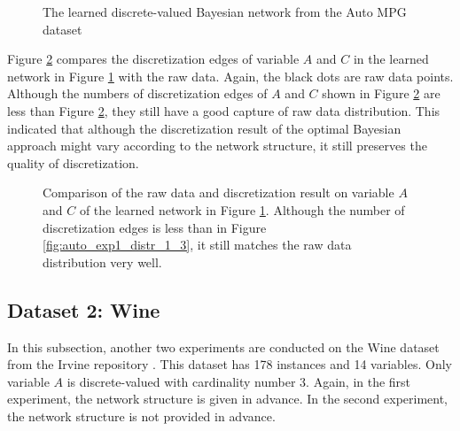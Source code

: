 \begin{figure}[ht]
\centering
      
  \caption{The learned discrete-valued Bayesian network from the Auto MPG dataset}
  \label{fig:auto_graph_2}
\end{figure}


Figure \ref{fig:auto_exp2_distr_1_3} compares the discretization edges of variable $A$ and $C$ in the learned network in Figure \ref{fig:auto_graph_2} with the raw data. Again, the black dots are raw data points. Although the numbers of discretization edges of $A$ and $C$ shown in Figure \ref{fig:auto_exp2_distr_1_3} are less than Figure \ref{fig:auto_exp2_distr_1_3}, they still have a good capture of raw data distribution. This indicated that although the discretization result of the optimal Bayesian approach might vary according to the network structure, it still preserves the quality of discretization.

\begin{figure}[ht]
      
  \caption{Comparison of the raw data and discretization result on variable $A$ and $C$ of the learned network in Figure \ref{fig:auto_graph_2}. Although the number of discretization edges is less than in Figure \ref{fig:auto_exp1_distr_1_3}, it still matches the raw data distribution very well.}
  \label{fig:auto_exp2_distr_1_3}
\end{figure}


\subsection{Dataset 2: Wine}
\label{subsec:wine}

In this subsection, another two experiments are conducted on the Wine dataset from the Irvine repository \citep{Lichman_2013}. This dataset has 178 instances and 14 variables. Only variable $A$ is discrete-valued with cardinality number \num{3}. Again, in the first experiment, the network structure is given in advance. In the second experiment, the network structure is not provided in advance.


